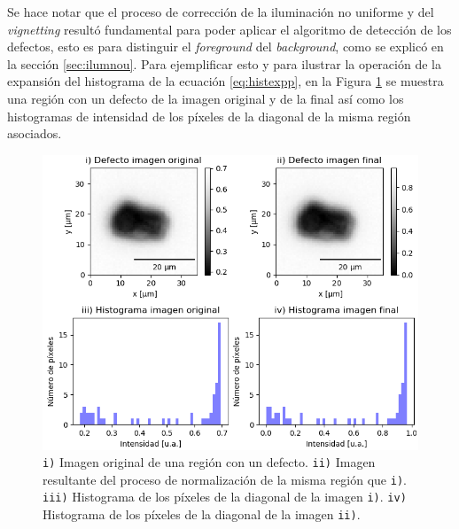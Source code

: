Se hace notar que el proceso de corrección de la iluminación no uniforme y del \textit{vignetting} resultó fundamental para poder aplicar el algoritmo de detección de los defectos, esto es para distinguir el \textit{foreground} del \textit{background}, como se explicó en la sección \ref{sec:ilumnou}. Para ejemplificar esto y para ilustrar la operación de la expansión del histograma de la ecuación \ref{eq:histexpp}, en la Figura \ref{fig:defecthi} se muestra una región con un defecto de la imagen original y de la final así como los histogramas de intensidad de los píxeles de la diagonal de la misma región asociados.


\begin{figure}[H]
	\centering
	\includegraphics[scale=1.0]{Figs/defectosZEISS/correccionilum/defectoehist.png}
	\caption{\texttt{i)} Imagen original de una región con un defecto. \texttt{ii)} Imagen resultante del proceso de normalización de la misma región que \texttt{i)}. \texttt{iii)} Histograma de los píxeles de la diagonal de la imagen \texttt{i)}. \texttt{iv)} Histograma de los píxeles de la diagonal de la imagen \texttt{ii)}.}
	\label{fig:defecthi}
\end{figure}

